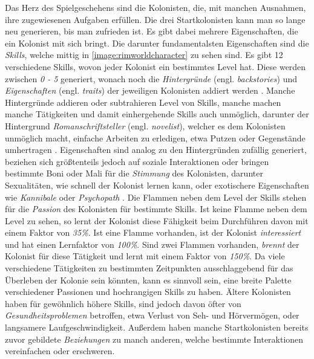Das Herz des Spielgeschehens sind die Kolonisten, die, mit manchen Ausnahmen, ihre zugewiesenen Aufgaben erfüllen. Die drei Startkolonisten kann man so lange neu generieren, bis man zufrieden ist. Es gibt dabei mehrere Eigenschaften, die ein Kolonist mit sich bringt. Die darunter fundamentalsten Eigenschaften sind die \textit{Skills}, welche mittig in \autoref{image:rimworldcharacter} zu sehen sind. Es gibt 12 verschiedene Skills, wovon jeder Kolonist ein bestimmtes Level hat. Diese werden zwischen \textit{0 - 5} generiert, wonach noch die \textit{Hintergründe} (engl. \textit{backstories}) und \textit{Eigenschaften} (engl. \textit{traits}) der jeweiligen Kolonisten addiert werden \cite*[]{rimworld:colonist}. Manche Hintergründe addieren oder subtrahieren Level von Skills, manche machen manche Tätigkeiten und damit einhergehende Skills auch unmöglich, darunter der Hintergrund \textit{Romanschriftsteller} (engl. \textit{novelist}), welcher es dem Kolonisten unmöglich macht, einfache Arbeiten zu erledigen, etwa Putzen oder Gegenstände umhertragen \cite*[]{rimworld:backstories}. Eigenschaften sind analog zu den Hintergründen zufällig generiert, beziehen sich größtenteils jedoch auf soziale Interaktionen oder bringen bestimmte Boni oder Mali für die \textit{Stimmung} des Kolonisten, darunter Sexualitäten, wie schnell der Kolonist lernen kann, oder exotischere Eigenschaften wie \textit{Kannibale} oder \textit{Psychopath} \cite*[]{rimworld:traits}. Die Flammen neben dem Level der Skills stehen für die \textit{Passion} des Kolonisten für bestimmte Skills. Ist keine Flamme neben dem Level zu sehen, so lernt der Kolonist diese Fähigkeit beim Durchführen davon mit einem Faktor von \textit{35\%}. Ist eine Flamme vorhanden, ist der Kolonist \textit{interessiert} und hat einen Lernfaktor von \textit{100\%}. Sind zwei Flammen vorhanden, \textit{brennt} der Kolonist für diese Tätigkeit und lernt mit einem Faktor von \textit{150\%}. Da viele verschiedene Tätigkeiten zu bestimmten Zeitpunkten ausschlaggebend für das Überleben der Kolonie sein könnten, kann es sinnvoll sein, eine breite Palette verschiedener Passionen und hochrangigen Skills zu haben. Ältere Kolonisten haben für gewöhnlich höhere Skills, sind jedoch davon öfter von \textit{Gesundheitsproblemen} betroffen, etwa Verlust von Seh- und Hörvermögen, oder langsamere Laufgeschwindigkeit. Außerdem haben manche Startkolonisten bereits zuvor gebildete \textit{Beziehungen} zu manch anderen, welche bestimmte Interaktionen vereinfachen oder erschweren.
 
